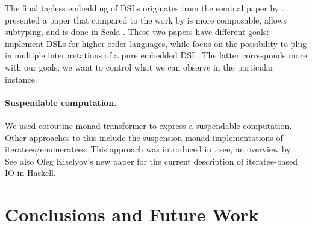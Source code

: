 The final tagless embedding of DSLs originates from the seminal paper by \citeauthor{final_tagless_embedding} \cite{final_tagless_embedding}.
\citeauthor{Hofer:2008:PED:1449913.1449935} \cite{Hofer:2008:PED:1449913.1449935} presented a paper that compared to the work by \citeauthor{final_tagless_embedding} \cite{final_tagless_embedding} is more composable, allows subtyping, and is done in Scala \cite{odersky2008programming}.
These two papers have different goals: \citeauthor{final_tagless_embedding} implement DSLs for higher-order languages, while \citeauthor{Hofer:2008:PED:1449913.1449935} focus on the possibility to plug in multiple interpretations of a pure embedded DSL.
The latter corresponds more with our goals: we want to control  what we can observe in the particular instance.

\paragraph{Suspendable computation.} We used coroutine monad transformer \cite{cmt} to express a suspendable computation.
Other approaches to this include the suspension monad implementations of iteratees/enumeratees. This approach was introduced in \cite{oleg-iteratee}, see, \eg an overview by \citeauthor{lato2010iteratee} \cite{lato2010iteratee}.
See also Oleg Kiselyov's new paper \cite{springerlink:10.1007/978-3-642-29822-6_15} for the current description of iteratee-based IO in Haskell.




\section{Conclusions and Future Work}
\label{sec:concl-future-work}

